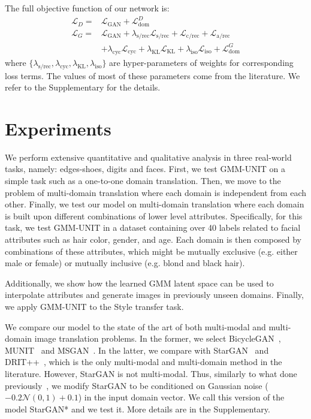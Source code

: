 \documentclass[runningheads]{llncs}
\begin{document}
\noindent The full objective function of our network is:
\begin{equation*}
\begin{split}
    \mathcal{L}_D =& \mathcal{L}_{\text{GAN}} + \mathcal{L}_{\text{dom}}^D\\
    \mathcal{L}_G =& \mathcal{L}_{\text{GAN}} + \lambda_{\text{s/rec}} \mathcal{L}_{\text{s/rec}} +  \mathcal{L}_{\text{c/rec}} + \mathcal{L}_{\text{a/rec}} \\ &+ \lambda_{\text{cyc}}\mathcal{L}_{\text{cyc}} +  \lambda_{\text{KL}}\mathcal{L}_{\text{KL}} + 
    \lambda_{\text{iso}}\mathcal{L}_{\text{iso}} + 
    \mathcal{L}_{\text{dom}}^G 
\end{split}
\end{equation*}
where $\{\lambda_{\textrm{s/rec}}, \lambda_{\textrm{cyc}}, \lambda_{\textrm{KL}}, \lambda_{\textrm{iso}}\}$ are hyper-parameters of weights for corresponding loss terms. The values of most of these parameters come from the literature. We refer to the Supplementary for the details.



\section{Experiments}
We perform extensive quantitative and qualitative analysis in three real-world tasks, namely: edges-shoes, digits and faces. First, we test GMM-UNIT on a simple task such as a one-to-one domain translation. Then, we move to the problem of multi-domain translation where each domain is independent from each other. Finally, we test our model on multi-domain translation where each domain is built upon different combinations of lower level attributes. Specifically, for this task, we test GMM-UNIT in a dataset containing over 40 labels related to facial attributes such as hair color, gender, and age. Each domain is then composed by combinations of these attributes, which might be mutually exclusive (e.g. either male or female) or mutually inclusive (e.g. blond and black hair).

Additionally, we show how the learned GMM latent space can be used to interpolate attributes and generate images in previously unseen domains.
Finally, we apply GMM-UNIT to the Style transfer task.

We compare our model to the state of the art of both multi-modal and multi-domain image translation problems. In the former, we select BicycleGAN~\cite{zhu2017toward}, MUNIT~\cite{zhu2017unpaired} and MSGAN~\cite{MSGAN}. In the latter, we compare with StarGAN~\cite{choi2018stargan} and DRIT++~\cite{lee2019drit++}, which is the only multi-modal and multi-domain method in the literature. However, StarGAN is not multi-modal. Thus, similarly to what done previously~\cite{zhu2017toward}, we modify StarGAN to be conditioned on Gaussian noise ($-0.2 \mathcal{N}(0,1) + 0.1$) in the input domain vector. We call this version of the model StarGAN* and we test it. More details are in the Supplementary.
\end{document}
